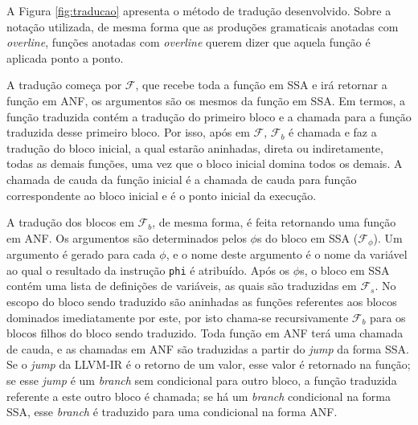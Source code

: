 A Figura \ref{fig:traducao} apresenta o método de tradução desenvolvido. Sobre a notação utilizada, de mesma forma que as produções gramaticais anotadas com \emph{overline}, funções anotadas com \emph{overline} querem dizer que aquela função é aplicada ponto a ponto. 

A tradução começa por $\mathcal{F}$, que recebe toda a função em SSA e irá retornar a função em ANF, os argumentos são os mesmos da função em SSA. Em termos, a função traduzida contém a tradução do primeiro bloco e a chamada para a função traduzida desse primeiro bloco. Por isso, após em $\mathcal{F}$, $\mathcal{F}_b$ é chamada e faz a tradução do bloco inicial, a qual estarão aninhadas, direta ou indiretamente, todas as demais funções, uma vez que o bloco inicial domina todos os demais. A chamada de cauda da função inicial é a chamada de cauda para função correspondente ao bloco inicial e é o ponto inicial da execução.

A tradução dos blocos em $\mathcal{F}_b$, de mesma forma, é feita retornando uma função em ANF. Os argumentos são determinados pelos $\phi$s do bloco em SSA ($\mathcal{F}_\phi$). Um argumento é gerado para cada $\phi$, e o nome deste argumento é o nome da variável ao qual o resultado da instrução \verb|phi| é atribuído. Após os $\phi$s, o bloco em SSA contém uma lista de definições de variáveis, as quais são traduzidas em $\mathcal{F}_s$. No escopo do bloco sendo traduzido são aninhadas as funções referentes aos blocos dominados imediatamente por este, por isto chama-se recursivamente $\mathcal{F}_b$ para os blocos filhos do bloco sendo traduzido. Toda função em ANF terá uma chamada de cauda, e as chamadas em ANF são traduzidas a partir do \emph{jump} da forma SSA. Se o \emph{jump} da LLVM-IR é o retorno de um valor, esse valor é retornado na função; se esse \emph{jump} é um \emph{branch} sem condicional para outro bloco, a função traduzida referente a este outro bloco é chamada; se há um \emph{branch} condicional na forma SSA, esse \emph{branch} é traduzido para uma condicional na forma ANF.

